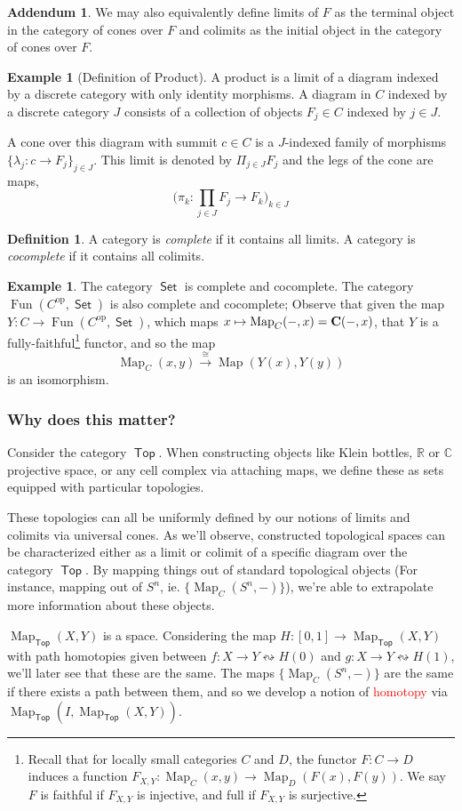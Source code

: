 \documentclass[leqno, openany]{memoir}
\theoremstyle{definition}
\newtheorem{defn}[thm]{Definition}
\newtheorem{exm}[thm]{Example}
\theoremstyle{remark}
\theoremstyle{plain}
\theoremstyle{definition}
\newtheorem*{addm*}{Addendum}
\theoremstyle{remark}
\newcommand{\R}{\mathbb{R}}
\newcommand{\C}{\mathbb{C}}
\newcommand{\iso}{\cong}
\newcommand{\opp}{^\text{op}}
\DeclareMathOperator{\Top}{\mathsf{Top}}
\DeclareMathOperator{\Sets}{\mathsf{Set}}
\DeclareMathOperator{\Map}{Map}
\DeclareMathOperator{\Fun}{Fun}
\begin{document}
\begin{addm*}
    We may also equivalently define limits of $F$ as the terminal object in the category of cones over $F$ and colimits as the initial object in the category of cones over $F$.
\end{addm*}

\begin{exm}[Definition of Product]
    A product is a limit of a diagram indexed by a discrete category with only identity morphisms. A diagram in $C$ indexed by a discrete category $J$ consists of a collection of objects $F_j \in C$ indexed by $j \in J$.
    
    A cone over this diagram with summit $c \in C$ is a $J$-indexed family of morphisms $\{\lambda_j: c \to F_j\}_{j \in J}$. This limit is denoted by $\Pi_{j\in J} F_j$ and the legs of the cone are maps,
    \[\bigg(\pi_k: \prod_{j \in J} F_j \to F_k \bigg)_{k \in J}\]
\end{exm}

\begin{defn}
    A category is \emph{complete} if it contains all limits. A category is \emph{cocomplete} if it contains all colimits.
\end{defn}

\begin{exm}
    The category $\Sets$ is complete and cocomplete. The category $\Fun(C\opp, \Sets)$ is also complete and cocomplete; Observe that given the map $Y: C \to \Fun(C\opp, \Sets)$, which maps $x \mapsto \Map_C(-,x) = \bold{C}(-,x)$, that $Y$ is a fully-faithful\footnote{Recall that for locally small categories $C$ and $D$, the functor $F: C \to D$ induces a function $F_{X,Y}:  \Map_C(x,y) \to \Map_D(F(x), F(y))$. We say $F$ is faithful if $F_{X,Y}$ is injective, and full if $F_{X,Y}$ is surjective.} functor, and so the map 
    \[\Map_C(x,y) \xrightarrow{\iso} \Map(Y(x), Y(y))\]
    is an isomorphism.
\end{exm}

\subsubsection{Why does this matter?}
Consider the category $\Top$. When constructing objects like Klein bottles, $\R$ or $\C$ projective space, or any cell complex via attaching maps, we define these as sets equipped with particular topologies. 

These topologies can all be uniformly defined by our notions of limits and colimits via universal cones. As we'll observe, constructed topological spaces can be characterized either as a limit or colimit of a specific diagram over the category $\Top$. By mapping things out of standard topological objects (For instance, mapping out of $S^n$, ie. $\{\Map_C(S^n, -)\}$), we're able to extrapolate more information about these objects.

$\Map_{\Top}(X,Y)$ is a space. Considering the map $H: [0,1] \to \Map_{\Top}(X,Y)$ with path homotopies given between $f:X \to Y \leftrightsquigarrow H(0)$ and $g: X \to Y \leftrightsquigarrow H(1)$, we'll later see that these are the same.  The maps $\{\Map_C(S^n, -)\}$ are the same if there exists a path between them, and so we develop a notion of \textcolor{red}{homotopy} via $\Map_{\Top}(I, \Map_{\Top}(X,Y))$.
\end{document}
